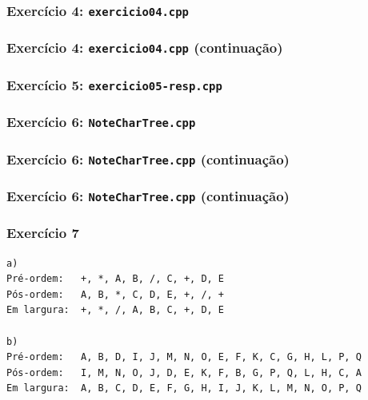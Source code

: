 \documentclass[aspectratio=169]{beamer}
\begin{document}
\begin{frame}[fragile]\frametitle{Exercício 4: \texttt{exercicio04.cpp}}
\fontsize{5pt}{5pt}\selectfont{

}
\end{frame}

\begin{frame}[fragile]\frametitle{Exercício 4: \texttt{exercicio04.cpp} (continuação)}

\end{frame}

\begin{frame}[fragile]\frametitle{Exercício 5: \texttt{exercicio05-resp.cpp}}
\fontsize{6pt}{6pt}\selectfont{

}
\end{frame}

\begin{frame}[fragile]\frametitle{Exercício 6: \texttt{NoteCharTree.cpp}}
\fontsize{3pt}{5pt}\selectfont{

}
\end{frame}

\begin{frame}[fragile]\frametitle{Exercício 6: \texttt{NoteCharTree.cpp} (continuação)}
\fontsize{3pt}{5pt}\selectfont{

}
\end{frame}

\begin{frame}[fragile]\frametitle{Exercício 6: \texttt{NoteCharTree.cpp} (continuação)}
\fontsize{3pt}{5pt}\selectfont{

}
\end{frame}

\begin{frame}[fragile]\frametitle{Exercício 7}
\begin{verbatim}
a)
Pré-ordem:   +, *, A, B, /, C, +, D, E
Pós-ordem:   A, B, *, C, D, E, +, /, +
Em largura:  +, *, /, A, B, C, +, D, E

b)
Pré-ordem:   A, B, D, I, J, M, N, O, E, F, K, C, G, H, L, P, Q
Pós-ordem:   I, M, N, O, J, D, E, K, F, B, G, P, Q, L, H, C, A
Em largura:  A, B, C, D, E, F, G, H, I, J, K, L, M, N, O, P, Q
\end{verbatim}
\end{frame}
\end{document}
